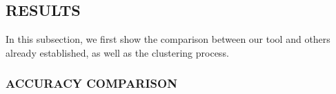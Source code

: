 \subsection{RESULTS}

In this subsection, we first show the comparison between our tool and others already established, as well as the clustering process.

\subsubsection{ACCURACY COMPARISON}


